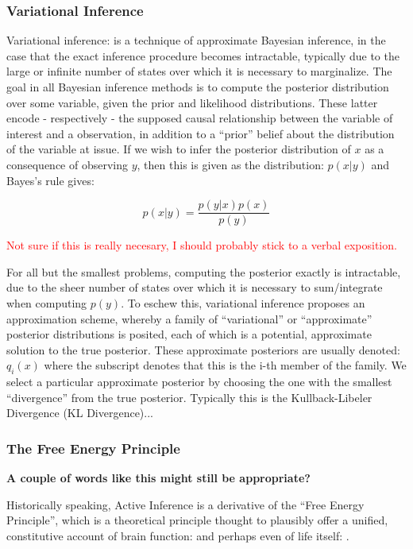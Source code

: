 \documentclass[onecolumn]{IEEEtran}
\begin{document}
\vspace{12pt}
\subsubsection{Variational Inference}
Variational inference: \textcite{Variational-Inference-Reviews} is a technique of approximate Bayesian inference, in the case that the exact inference procedure becomes intractable, typically due to the large or infinite number of states over which it is necessary to marginalize. The goal in all Bayesian inference methods is to compute the posterior distribution over some variable, given the prior and likelihood distributions. These latter encode - respectively - the supposed causal relationship between the variable of interest and a observation, in addition to a ``prior'' belief about the distribution of the variable at issue. If we wish to infer the posterior distribution of $x$ as a consequence of observing $y$, then this is given as the distribution: $p(x | y)$ and Bayes's rule gives: 

$$ p(x | y) = \frac{p(y | x)p(x)}{p(y)} $$

\textcolor{red}{Not sure if this is really necesary, I should probably stick to a verbal exposition.}

For all but the smallest problems, computing the posterior exactly is intractable, due to the sheer number of states over which it is necessary to sum/integrate when computing $p(y)$. To eschew this, variational inference proposes an approximation scheme, whereby a family of ``variational'' or ``approximate'' posterior distributions is posited, each of which is a potential, approximate solution to the true posterior. These approximate posteriors are usually denoted: $q_i(x)$ where the subscript denotes that this is the i-th member of the family. We select a particular approximate posterior by choosing the one with the smallest ``divergence'' from the true posterior. Typically this is the Kullback-Libeler Divergence (KL Divergence)...

\vspace{12pt}
\subsubsection{The Free Energy Principle}

\textbf{A couple of words like this might still be appropriate?}

Historically speaking, Active Inference is a derivative of the ``Free Energy Principle'', which is a theoretical principle thought to plausibly offer a unified, constitutive account of brain function: \textcite{FEP-Rough-Guide-Brain} and perhaps even of life itself: \textcite{Life-As-We-Know-It}. 
\end{document}

